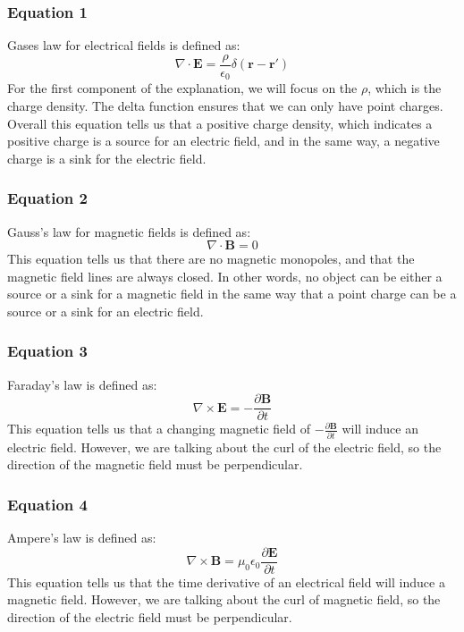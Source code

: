 \documentclass{article}
\begin{document}
\subsubsection{Equation 1}
Gases law for electrical fields is defined as:
\begin{equation}
    \nabla \cdot \mathbf{E} = \frac{\rho}{\epsilon_0}\delta(\mathbf{r}-\mathbf{r}')
\end{equation}
For the first component of the explanation, we will focus on the $\rho$, which is the charge density. The delta function ensures that we can only have point charges. Overall this equation tells us that a positive charge density, which indicates a positive charge is a source for an electric field, and in the same way, a negative charge is a sink for the electric field.
\subsubsection{Equation 2}
Gauss's law for magnetic fields is defined as:
\begin{equation}
    \nabla \cdot \mathbf{B} = 0
\end{equation}
This equation tells us that there are no magnetic monopoles, and that the magnetic field lines are always closed. In other words, no object can be either a source or a sink for a magnetic field in the same way that a point charge can be a source or a sink for an electric field.
\subsubsection{Equation 3}
Faraday's law is defined as:
\begin{equation}
    \nabla \times \mathbf{E} = -\frac{\partial \mathbf{B}}{\partial t}
\end{equation}
This equation tells us that a changing magnetic field of $-\frac{\partial \mathbf{B}}{\partial t}$ will induce an electric field. However, we are talking about the curl of the electric field, so the direction of the magnetic field must be perpendicular.
\subsubsection{Equation 4}
Ampere's law is defined as:
\begin{equation}
    \nabla \times \mathbf{B} = \mu_0 \epsilon_0 \frac{\partial \mathbf{E}}{\partial t}
\end{equation}
This equation tells us that the time derivative of an electrical field will induce a magnetic field. However, we are talking about the curl of magnetic field, so the direction of the electric field must be perpendicular.
\end{document}
